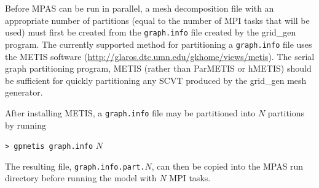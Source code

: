 Before MPAS can be run in parallel, a mesh decomposition file with an appropriate number of 
partitions (equal to the number of MPI tasks that will be used) must first be created from the {\tt graph.info}
file created by the grid\_gen program. The currently supported method for partitioning a {\tt graph.info} file
uses the METIS software (\url{http://glaros.dtc.umn.edu/gkhome/views/metis}). The serial graph partitioning program, METIS (rather than ParMETIS or hMETIS) should be sufficient for quickly partitioning any SCVT produced by the grid\_gen mesh generator.

After installing METIS, a {\tt graph.info} file may be partitioned into $N$ partitions by running

\vspace{12pt}
{\tt > gpmetis graph.info} $N$
\vspace{12pt}

\noindent The resulting file, {\tt graph.info.part.}$N$, can then be copied into the MPAS run directory
before running the model with $N$ MPI tasks.

